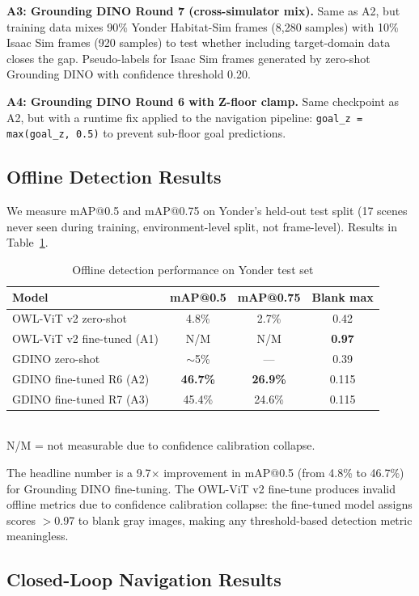 \documentclass[conference]{IEEEtran}
\begin{document}
\textbf{A3: Grounding DINO Round 7 (cross-simulator mix).} Same as A2, but training data mixes 90\% Yonder Habitat-Sim frames (8,280 samples) with 10\% Isaac Sim frames (920 samples) to test whether including target-domain data closes the gap. Pseudo-labels for Isaac Sim frames generated by zero-shot Grounding DINO with confidence threshold 0.20.

\textbf{A4: Grounding DINO Round 6 with Z-floor clamp.} Same checkpoint as A2, but with a runtime fix applied to the navigation pipeline: \verb|goal_z = max(goal_z, 0.5)| to prevent sub-floor goal predictions.

\subsection{Offline Detection Results}

We measure mAP@0.5 and mAP@0.75 on Yonder's held-out test split (17 scenes never seen during training, environment-level split, not frame-level). Results in Table~\ref{tab:offline}.

\begin{table}[t]
\centering
\caption{Offline detection performance on Yonder test set}
\label{tab:offline}
\begin{tabular}{lccc}
\toprule
Model & mAP@0.5 & mAP@0.75 & Blank max \\
\midrule
OWL-ViT v2 zero-shot & 4.8\% & 2.7\% & 0.42 \\
OWL-ViT v2 fine-tuned (A1) & N/M & N/M & \textbf{0.97} \\
GDINO zero-shot & $\sim$5\% & --- & 0.39 \\
GDINO fine-tuned R6 (A2) & \textbf{46.7\%} & \textbf{26.9\%} & 0.115 \\
GDINO fine-tuned R7 (A3) & 45.4\% & 24.6\% & 0.115 \\
\bottomrule
\end{tabular}
\\[0.5em]
\footnotesize{N/M = not measurable due to confidence calibration collapse.}
\end{table}

The headline number is a 9.7$\times$ improvement in mAP@0.5 (from 4.8\% to 46.7\%) for Grounding DINO fine-tuning. The OWL-ViT v2 fine-tune produces invalid offline metrics due to confidence calibration collapse: the fine-tuned model assigns scores $>$0.97 to blank gray images, making any threshold-based detection metric meaningless.

\subsection{Closed-Loop Navigation Results}
\end{document}
